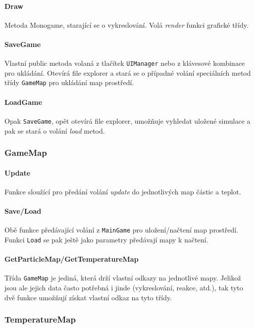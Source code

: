 \documentclass[a4paper, 12pt]{article}
\begin{document}
\paragraph{Draw}
Metoda Monogame, starající se o vykreslování. Volá \emph{render} funkci
grafické třídy.

\paragraph{SaveGame}
Vlastní public metoda volaná z tlačítek \texttt{UIManager} nebo z klávesové
kombinace pro ukládání. Otevírá file explorer a stará se o případné volání
speciálních metod třídy \texttt{GameMap} pro ukládání map prostředí.

\paragraph{LoadGame}
Opak \texttt{SaveGame}, opět otevírá file explorer, umožňuje vyhledat uložené
simulace a pak se stará o volání \emph{load} metod.

\subsubsection{GameMap}
\paragraph{Update}
Funkce sloužící pro předání volání \emph{update} do jednotlivých map částic a
teplot.

\paragraph{Save/Load}
Obě funkce předávající volání z \texttt{MainGame} pro uložení/načtení map
prostředí. Funkci \texttt{Load} se pak ještě jako parametry předávají mapy k
načtení.

\paragraph{GetParticleMap/GetTemperatureMap}
Třída \texttt{GameMap} je jediná, která drží vlastní odkazy na jednotlivé mapy.
Jelikož jsou ale jejich data často potřebná i jinde (vykreslování, reakce,
atd.), tak tyto dvě funkce umožňují získat vlastní odkaz na tyto třídy.

\subsubsection{TemperatureMap}
\end{document}
